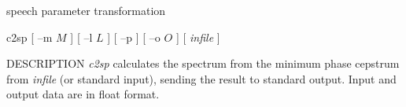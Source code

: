 % 
% 
% 
% 
%                                                                        
%
\hypertarget{c2sp}{}
{speech parameter transformation}

\begin{synopsis}
\item[c2sp] [ --m $M$ ] [ --l $L$ ] [ --p ] [ --o $O$ ] [ {\em infile} ]
\end{synopsis}

\begin{qsection}{DESCRIPTION}
{\em c2sp} calculates the spectrum from the minimum phase cepstrum 
from {\em infile} (or standard input), 
sending the result to standard output.
Input and output data are in float format.
\end{qsection}

